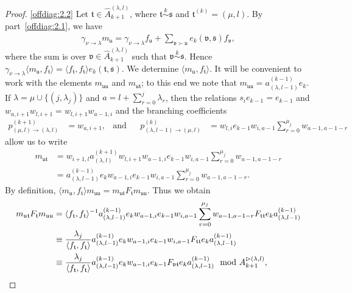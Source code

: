 \documentclass[11pt,a4paper,reqno,svgnames]{amsart}
\theoremstyle{plain}
\theoremstyle{definition}
\numberwithin{equation}{section}
\begin{document}
\begin{proof}
\eqref{offdiag:2.2} Let $\mathfrak{t}\in\hat{A}_{k+1}^{(\lambda,l)}$, where $\mathfrak{t}\stackrel{k}{\sim}\mathfrak{s}$ and $\mathfrak{t}^{(k)}=(\mu,l)$. By part~\eqref{offdiag:2.1}, we have 
\begin{align*}
\gamma_{\nu\to\lambda}m_\mathfrak{u}=\gamma_{\nu\to\lambda}f_\mathfrak{u}+\sum_{\mathfrak{v}\succ\mathfrak{u}}e_k(\mathfrak{v,s})f_\mathfrak{v},
\end{align*}
where the sum is over $\mathfrak{v}\in\hat{A}_{k+1}^{(\lambda,l)}$ such that $\mathfrak{v}\stackrel{k}{\sim}\mathfrak{s}$. Hence $\gamma_{\nu\to\lambda}\langle m_\mathfrak{u},f_\mathfrak{t}\rangle = \langle f_\mathfrak{t},f_\mathfrak{t}\rangle e_k(\mathfrak{t,s})$. We determine $\langle m_\mathfrak{u},f_\mathfrak{t}\rangle$.  It will be convenient to work with the elements $m_\mathfrak{uu}$ and $m_\mathfrak{ut}$; to this end we note that $m_\mathfrak{uu}=a_{(\lambda,l-1)}^{(k-1)}e_k$.  If $\lambda=\mu\cup\lbrace (j,\lambda_j)\rbrace$ and $a=l+\sum_{r=0}^{j}\lambda_r$, then  the relations $s_ie_{k-1}=e_{k-1}$ and $w_{a,i+1}w_{l,i+1}=w_{l,i+1}w_{a-1,i}$ and the branching coefficients
\begin{align*}
p_{(\mu,l)\to(\lambda,l)}^{(k+1)}&=w_{a,i+1}, &\text{and}& &p_{(\lambda,l-1)\to(\mu,l)}^{(k)}&=w_{l,i}e_{k-1}w_{i,a-1}\sum_{r=0}^{\mu_j}w_{a-1,a-1-r}
\end{align*}
allow us to write
\begin{align*}
m_\mathfrak{ut}
&=w_{i+1,l}a_{(\lambda,l)}^{(k+1)}w_{l,i+1}w_{a-1,i}e_{k-1}w_{i,a-1}\sum_{r=0}^{\mu_j}w_{a-1,a-1-r} \\ 
&= a_{(\lambda,l-1)}^{(k-1)}e_kw_{a-1,i}e_{k-1}w_{i,a-1}\sum_{r=0}^{\mu_j}w_{a-1,a-1-r}. 
\end{align*}
By definition, $\langle m_\mathfrak{u},f_\mathfrak{t}\rangle m_\mathfrak{uu}= m_\mathfrak{ut}F_\mathfrak{t} m_\mathfrak{uu}$. Thus we obtain 
\begin{align}
m_\mathfrak{ut}F_\mathfrak{t} m_\mathfrak{uu}&= \langle f_\mathfrak{t},f_\mathfrak{t}\rangle^{-1}a_{(\lambda,l-1)}^{(k-1)}e_k w_{a-1,i}e_{k-1}w_{i,a-1}\sum_{r=0}^{\mu_j}w_{a-1,a-1-r}F_\mathfrak{tt}e_ka_{(\lambda,l-1)}^{(k-1)}\notag\\
&\equiv \frac{\lambda_j}{\langle f_\mathfrak{t},f_\mathfrak{t}\rangle} a_{(\lambda,l-1)}^{(k-1)}e_k w_{a-1,i}e_{k-1}w_{i,a-1}F_\mathfrak{tt}e_ka_{(\lambda,l-1)}^{(k-1)}\notag\\
&\equiv \frac{\lambda_j}{\langle f_\mathfrak{t},f_\mathfrak{t}\rangle} a_{(\lambda,l-1)}^{(k-1)}e_k w_{a-1,i}e_{k-1}F_\mathfrak{vt}e_ka_{(\lambda,l-1)}^{(k-1)}\mod A_{k+1}^{\rhd(\lambda,l)},\label{ref}

\end{align}
\end{proof}
\end{document}
